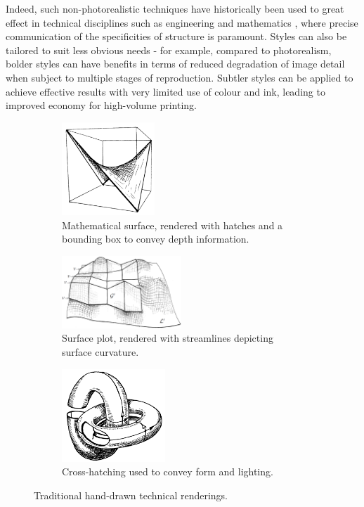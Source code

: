 Indeed, such non-photorealistic techniques have historically been used to great effect in technical disciplines such as engineering \citep{porter1988} and mathematics \citep{francis2007}, where precise communication of the specificities of structure is paramount. Styles can also be tailored to suit less obvious needs - for example, compared to photorealism, bolder styles can have benefits in terms of reduced degradation of image detail when subject to multiple stages of reproduction. Subtler styles can be applied to achieve effective results with very limited use of colour and ink, leading to improved economy for high-volume printing.

\begin{figure}[h]
	\centering
	\begin{subfigure}[b]{0.3\textwidth}
		\includegraphics[height=3.5cm]{images/ex_hand_drawn1}
		\caption{Mathematical surface, rendered with hatches and a bounding box to convey depth information.}\label{ex_hand_drawn1}
	\end{subfigure}
	\begin{subfigure}[b]{0.3\textwidth}
		\includegraphics[width=4.5cm]{images/ex_hand_drawn2}
		\caption{Surface plot, rendered with streamlines depicting surface curvature.}\label{ex_hand_drawn2}
	\end{subfigure}
	\begin{subfigure}[b]{0.3\textwidth}
		\includegraphics[height=3.5cm]{images/ex_hand_drawn3}
		\caption{Cross-hatching used to convey form and lighting.}\label{ex_hand_drawn3}
	\end{subfigure}
	\caption{Traditional hand-drawn technical renderings.}
\end{figure}

